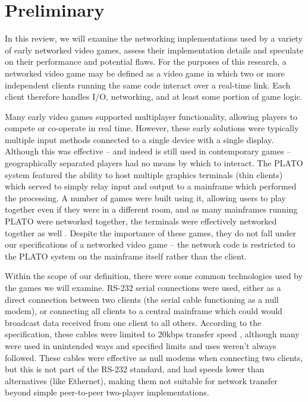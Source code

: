 \section{Preliminary}
\label{sec:pre}


In this review, we will examine the networking implementations used by a variety of early networked video games, assess their implementation details and speculate on their performance and potential flaws. For the purposes of this research, a networked video game may be defined as a video game in which two or more independent clients running the same code interact over a real-time link. Each client therefore handles I/O, networking, and at least some portion of game logic.

Many early video games supported multiplayer functionality, allowing players to compete or co-operate in real time. However, these early solutions were typically multiple input methods connected to a single device with a single display. Although this was effective -- and indeed is still used in contemporary games -- geographically separated players had no means by which to interact.
The PLATO system featured the ability to host multiple graphics terminals (thin clients) which served to simply relay input and output to a mainframe which performed the processing. A number of games were built using it, allowing users to play together even if they were in a different room, and as many mainframes running PLATO were networked together, the terminals were effectively networked together as well \cite{plato}.
Despite the importance of these games, they do not fall under our specifications of a networked video game -- the network code is restricted to the PLATO system on the mainframe itself rather than the client.

Within the scope of our definition, there were some common technologies used by the games we will examine. RS-232 serial connections were used, either as a direct connection between two clients (the serial cable functioning as a null modem), or connecting all clients to a central mainframe which could would broadcast data received from one client to all others. According to the specification, these cables were limited to 20kbps transfer speed \cite{Buchanan2004}, although many were used in unintended ways and specified limits and uses weren't always followed. These cables were effective as null modems when connecting two clients, but this is not part of the RS-232 standard, and had speeds lower than alternatives (like Ethernet), making them not suitable for network transfer beyond simple peer-to-peer two-player implementations.

